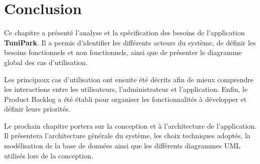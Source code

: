 \section{Conclusion}

\par Ce chapitre a présenté l'analyse et la spécification des besoins de l'application \textbf{TuniPark}. Il a permis d'identifier les différents acteurs du système, de définir les besoins fonctionnels et non fonctionnels, ainsi que de présenter le diagramme global des cas d'utilisation.

\par Les principaux cas d'utilisation ont ensuite été décrits afin de mieux comprendre les interactions entre les utilisateurs, l'administrateur et l'application. Enfin, le Product Backlog a été établi pour organiser les fonctionnalités à développer et définir leurs priorités.

\par Le prochain chapitre portera sur la conception et à l'architecture de l'application. Il présentera l'architecture générale du système, les choix techniques adoptés, la modélisation de la base de données ainsi que les différents diagrammes UML utilisés lors de la conception.